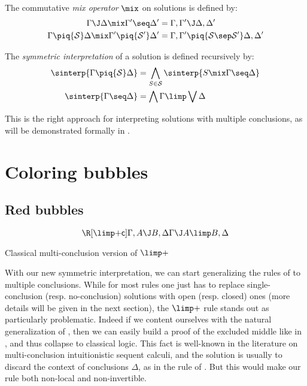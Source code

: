 \begin{definition}
  The commutative \emph{mix operator} $\mix$ on solutions is defined by:
  \begin{align*}
    \Gamma \J \Delta \mix \Gamma' \seq \Delta' &=
      \Gamma, \Gamma' \J \Delta, \Delta' \\
    \Gamma \piq{\mathcal{S}} \Delta \mix \Gamma' \piq{\mathcal{S'}} \Delta' &=
      \Gamma, \Gamma' \piq{\mathcal{S} \sep \mathcal{S'}} \Delta, \Delta' \\
  \end{align*}
\end{definition}

\begin{definition}
  The \emph{symmetric interpretation} of a solution is defined recursively by:
  \begin{align*}
    \sinterp{\Gamma \piq{\mathcal{S}} \Delta} &=
      \bigwedge_{S \in \mathcal{S}} \sinterp{S \mix \Gamma \seq \Delta} \\
    \sinterp{\Gamma \seq \Delta} &=
      \bigwedge \Gamma \limp \bigvee \Delta
  \end{align*}
\end{definition}

This is the right approach for interpreting solutions with multiple conclusions,
as will be demonstrated formally in .

\section{Coloring bubbles}

\subsection{Red bubbles}

\begin{marginfigure}
  $$
  \R[\mathsf{{\limp}{+}c}]
    {\Gamma, A \J B, \Delta}
    {\Gamma \J A \limp B, \Delta}
  $$
  \caption{Classical multi-conclusion version of ${\limp}{+}$}
  \label{wrong-imp-pos}
\end{marginfigure}

With our new symmetric interpretation, we can start generalizing the rules of
 to multiple conclusions. While for most rules one just has to replace
single-conclusion (resp. no-conclusion) solutions with open (resp. closed) ones
(more details will be given in the next section), the ${\limp}{+}$ rule stands
out as particularly problematic. Indeed if we content ourselves with the natural
generalization {} of , then we can
easily build a proof of the excluded middle like in , and thus
collapse to classical logic. This fact is well-known in the literature on
multi-conclusion intuitionistic sequent calculi, and the solution is usually to
discard the context of conclusions $\Delta$, as in the {} rule
of . But this would make our rule both non-local and
non-invertible.


